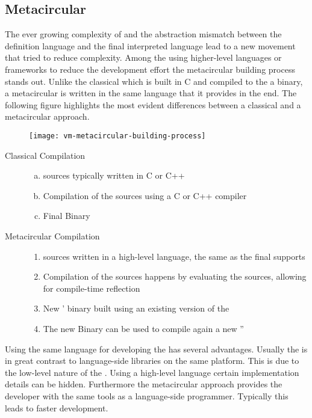 \subsection{Metacircular \VMs}
The ever growing complexity of \VMs and the abstraction mismatch between the \VM definition language and the final interpreted language lead to a new movement that tried to reduce complexity.
Among the \VMs using higher-level languages or frameworks to reduce the development effort the metacircular building process stands out.
Unlike the classical \VM which is built in C and compiled to the a binary, a metacircular \VM is written in the same language that it provides in the end.
The following figure highlights the most evident differences between a classical and a metacircular approach.
%
\begin{figure}[h]
	\centering
	\texttt{[image: vm-metacircular-building-process]}
\end{figure}
%
\begin{description}
\item[Classical \VM Compilation] \hfill
	\begin{enumerate}[a), nolistsep]
		\item \VM sources typically written in C or C++
		\item Compilation of the \VM sources using a C or C++ compiler
		\item Final Binary
	\end{enumerate}

\item[Metacircular \VM Compilation] \hfill
	\begin{enumerate}[nolistsep]
		\item \VM sources written in a high-level language, the same as the final \VM supports
		\item Compilation of the \VM sources happens by evaluating the \VM sources, allowing for compile-time reflection
		\item New \VM' binary built using an existing version of the \VM
		\item The new \VM Binary can be used to compile again a new \VM''
	\end{enumerate}
\end{description}

\noindent Using the same language for developing the \VM has several advantages.
Usually the \VM is in great contrast to language-side libraries on the same platform.
This is due to the low-level nature of the \VM.
Using a high-level language certain implementation details can be hidden.
Furthermore the metacircular approach provides the \VM developer with the same tools as a language-side programmer.
Typically this leads to faster development.


